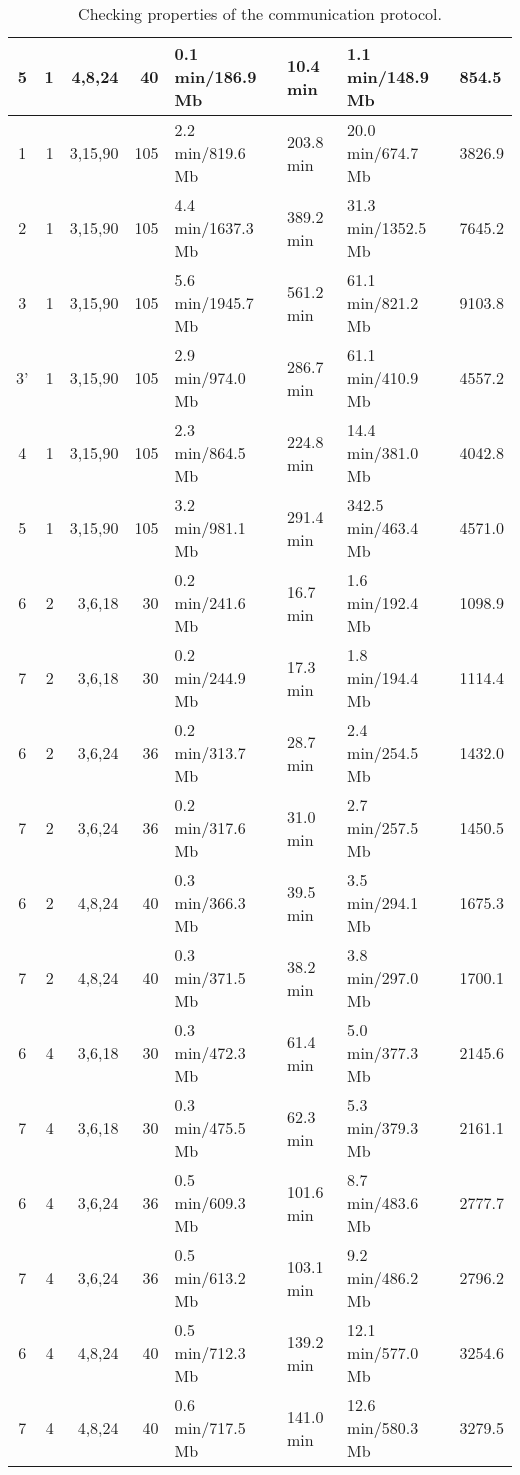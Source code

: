 \documentclass[a4paper]{article}
\theoremstyle{plain}
\theoremstyle{definition}
\begin{document}
\begin{table}[htbp]
\begin{center}
\begin{scriptsize}
\begin{tabular}{|c r r r l l l l|}
5  &  1  &  4,8,24  &  40  &  0.1 min/186.9 Mb  &  10.4 min  &  1.1 min/148.9 Mb & 854.5 \\
\hline
1  &  1  &  3,15,90  &  105  &  2.2 min/819.6 Mb  &  203.8 min  &  20.0 min/674.7 Mb & 3826.9 \\
2  &  1  &  3,15,90  &  105  &  4.4 min/1637.3 Mb  &  389.2 min  &  31.3 min/1352.5 Mb & 7645.2 \\
3  &  1  &  3,15,90  &  105  &  5.6 min/1945.7 Mb  &  561.2 min  &  61.1 min/821.2 Mb & 9103.8 \\
3'  &  1  &  3,15,90  &  105  &  2.9 min/974.0 Mb  &  286.7 min  &  61.1 min/410.9 Mb & 4557.2 \\
4  &  1  &  3,15,90  &  105  &  2.3 min/864.5 Mb  &  224.8 min  &  14.4 min/381.0 Mb & 4042.8 \\
5  &  1  &  3,15,90  &  105  &  3.2 min/981.1 Mb  &  291.4 min  &  342.5 min/463.4 Mb & 4571.0 \\
\hline
\hline
6  &  2  &  3,6,18  &  30  &  0.2 min/241.6 Mb  &  16.7 min  &  1.6 min/192.4 Mb & 1098.9 \\
7  &  2  &  3,6,18  &  30  &  0.2 min/244.9 Mb  &  17.3 min  &  1.8 min/194.4 Mb & 1114.4 \\
\hline
6  &  2  &  3,6,24  &  36  &  0.2 min/313.7 Mb  &  28.7 min  &  2.4 min/254.5 Mb & 1432.0 \\
7  &  2  &  3,6,24  &  36  &  0.2 min/317.6 Mb  &  31.0 min  &  2.7 min/257.5 Mb & 1450.5 \\
\hline
6  &  2  &  4,8,24  &  40  &  0.3 min/366.3 Mb  &  39.5 min  &  3.5 min/294.1 Mb & 1675.3 \\
7  &  2  &  4,8,24  &  40  &  0.3 min/371.5 Mb  &  38.2 min  &  3.8 min/297.0 Mb & 1700.1 \\
\hline
\hline
6  &  4  &  3,6,18  &  30  &  0.3 min/472.3 Mb  &  61.4 min  &  5.0 min/377.3 Mb & 2145.6 \\
7  &  4  &  3,6,18  &  30  &  0.3 min/475.5 Mb  &  62.3 min  &  5.3 min/379.3 Mb & 2161.1 \\
\hline
6  &  4  &  3,6,24  &  36  &  0.5 min/609.3 Mb  &  101.6 min  &  8.7 min/483.6 Mb & 2777.7 \\
7  &  4  &  3,6,24  &  36  &  0.5 min/613.2 Mb  &  103.1 min  &  9.2 min/486.2 Mb & 2796.2 \\
\hline
6  &  4  &  4,8,24  &  40  &  0.5 min/712.3 Mb  &  139.2 min  &  12.1 min/577.0 Mb & 3254.6 \\
7  &  4  &  4,8,24  &  40  &  0.6 min/717.5 Mb  &  141.0 min  &  12.6 min/580.3 Mb & 3279.5 \\
\hline
\end{tabular}
\end{scriptsize}
\caption{Checking properties of the communication protocol.}
\label{tab:single}
\end{center}
\end{table}
\end{document}
